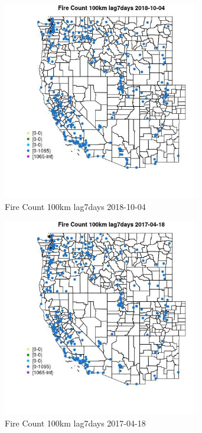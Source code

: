 \begin{figure} 
\centering  
\includegraphics[width=0.77\textwidth]{Code_Outputs/Report_ML_input_PM25_Step4_part_f_de_duplicated_aves_prioritize_24hr_obswNAs_MapObsFire_Count_100km_lag7days2018-10-04.jpg} 
\caption{\label{fig:Report_ML_input_PM25_Step4_part_f_de_duplicated_aves_prioritize_24hr_obswNAsMapObsFire_Count_100km_lag7days2018-10-04}Fire Count 100km lag7days 2018-10-04} 
\end{figure} 
 

\begin{figure} 
\centering  
\includegraphics[width=0.77\textwidth]{Code_Outputs/Report_ML_input_PM25_Step4_part_f_de_duplicated_aves_prioritize_24hr_obswNAs_MapObsFire_Count_100km_lag7days2017-04-18.jpg} 
\caption{\label{fig:Report_ML_input_PM25_Step4_part_f_de_duplicated_aves_prioritize_24hr_obswNAsMapObsFire_Count_100km_lag7days2017-04-18}Fire Count 100km lag7days 2017-04-18} 
\end{figure} 
 

